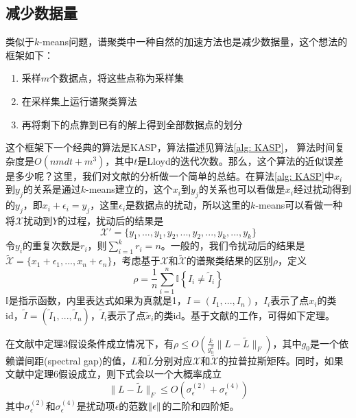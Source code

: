 \subsection{减少数据量}
类似于$k$-means问题，谱聚类中一种自然的加速方法也是减少数据量，这个想法的框架如下：
\begin{enumerate}
    \item 采样$m$个数据点，将这些点称为采样集
    \item 在采样集上运行谱聚类算法
    \item 再将剩下的点靠到已有的解上得到全部数据点的划分
\end{enumerate}
这个框架下一个经典的算法是KASP，算法描述见算法\ref{alg: KASP}，
算法时间复杂度是$O(nmdt+m^3)$，其中$t$是Lloyd的迭代次数。那么，这个算法的近似误差是多少呢？这里，我们对文献\cite{yan2009fast}的分析做一个简单的总结。在算法\ref{alg: KASP}中$x_i$到$y_j$的关系是通过$k$-means建立的，这个$x_i$到$y_j$的关系也可以看做是$x_i$经过扰动得到的$y_j$，即$x_i+\epsilon_i = y_j$，这里$\epsilon_i$是数据点的扰动，所以这里的$k$-means可以看做一种将$\mathcal{X}$扰动到$Y$的过程，扰动后的结果是
\begin{equation}
    \mathcal{X}' = \{y_1,...,y_1,y_2,...,y_2,...,y_k,...,y_k\}
\end{equation}
令$y_i$的重复次数是$r_i$，则$\sum_{i=1}^k r_i = n$。一般的，我们令扰动后的结果是$\tilde{\mathcal{X}} = \{x_1+\epsilon_1,...,x_n+\epsilon_n\}$，考虑基于$\mathcal{X}$和$\tilde{\mathcal{X}}$的谱聚类结果的区别$\rho$，定义
\begin{equation}
    \rho=\frac{1}{n} \sum_{i=1}^{n} \mathbb{I}\left\{I_{i} \neq \tilde{I}_{i}\right\}
\end{equation}
$\mathbb{I}$是指示函数，内里表达式如果为真就是1，$I = (I_1,...,I_n)$，$I_i$表示了点$x_i$的类id，$\tilde{I} = (\tilde{I}_1,...,\tilde{I}_n)$，$\tilde{I}_i$表示了点$\tilde{x}_i$的类id。基于文献\cite{huang2009spectral}的工作，可得如下定理。
\begin{theorem}[KASP的理论保证]
    在文献\cite{yan2009fast}中定理3假设条件成立情况下，有$\rho \leq O\left(\frac{k}{g_{0}^{2}}\|L-\tilde{L}\|_{F}\right)$，其中$g_0$是一个依赖谱间距(spectral gap)的值，$L$和$\tilde{L}$分别对应$\mathcal{X}$和$\tilde{\mathcal{X}}$的拉普拉斯矩阵。同时，如果文献\cite{yan2009fast}中定理6假设成立，则下式会以一个大概率成立
    \begin{equation}
        \|L-\tilde{L}\|_{F} \leq O\left(\sigma_{\epsilon}^{(2)}+\sigma_{\epsilon}^{(4)}\right)
    \end{equation}
    其中$\sigma_{\epsilon}^{(2)}$和$\sigma_{\epsilon}^{(4)}$是扰动项$\epsilon$的范数$\left\lVert\epsilon\right\rVert$的二阶和四阶矩。
\end{theorem}

